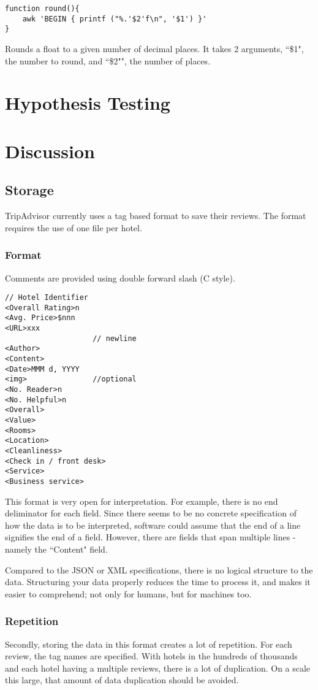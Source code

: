 \documentclass[a4paper]{article}
\begin{document}
\begin{lstlisting}
function round(){
	awk 'BEGIN { printf ("%.'$2'f\n", '$1') }'
}
\end{lstlisting}
Rounds a float to a given number of decimal places.
It takes 2 arguments, ``\$1", the number to round, and ``\$2"", the number of places.

\newpage
\section{Hypothesis Testing}


\newpage
\section{Discussion}

\subsection{Storage}
TripAdvisor currently uses a tag based format to save their reviews.
The format requires the use of one file per hotel.

\subsubsection{Format}
Comments are provided using double forward slash (C style).
\begin{lstlisting}[language={}]
// Hotel Identifier
<Overall Rating>n
<Avg. Price>$nnn
<URL>xxx
					// newline
<Author>
<Content>
<Date>MMM d, YYYY
<img>				//optional
<No. Reader>n
<No. Helpful>n
<Overall>
<Value>
<Rooms>
<Location>
<Cleanliness>
<Check in / front desk>
<Service>
<Business service>
\end{lstlisting}
This format is very open for interpretation.
For example, there is no end deliminator for each field.
Since there seems to be no concrete specification of how the data is to be interpreted, software could assume that the end of a line signifies the end of a field.
However, there are fields that span multiple lines - namely the ``Content" field.

Compared to the JSON or XML specifications, there is no logical structure to the data.
Structuring your data properly reduces the time to process it, and makes it easier to comprehend; not only for humans, but for machines too.

\subsubsection{Repetition}
Secondly, storing the data in this format creates a lot of repetition.
For each review, the tag names are specified.
With hotels in the hundreds of thousands and each hotel having a multiple reviews, there is a lot of duplication.
On a scale this large, that amount of data duplication should be avoided.
\end{document}
